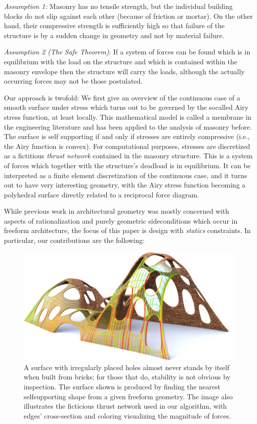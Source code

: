\documentclass[review]{acmsiggraph}
\begin{document}
{\it Assumption 1:} Masonry has no tensile strength, but the individual 
building blocks do not slip against each other (because of friction or 
mortar). On the other hand, their compressive strength is sufficiently 
high so that failure of the structure is by a sudden change in geometry
and not by material failure.

{\it Assumption 2 (The Safe Theorem)}: If a system of forces can be found 
which is in equilibrium with the load on the structure and which is 
contained within the masonry envelope then the structure will carry the 
loads, although the actually occurring forces may not be those postulated.

Our approach is twofold: We first give an overview of the continuous case 
of a smooth surface under stress which turns out to be governed by the 
so\dash called Airy stress function, at least locally. This mathematical 
model is called a membrane in the engineering literature and has been 
applied to the analysis of masonry before. The surface is self\dash 
supporting if and only if stresses are entirely compressive (i.e., the 
Airy function is convex). For computational purposes, stresses are 
discretized as a fictitious {\em thrust network} \cite{Block07} contained 
in the masonry structure. This is a system of forces which together with 
the structure's deadload is in equilibrium. It can be interpreted as a 
finite element discretization of the continuous case, and it turns out to 
have very interesting geometry, with the Airy stress function becoming a
polyhedral surface directly related to a reciprocal force diagram. 

While previous work in architectural geometry was mostly concerned
with aspects of rationalization and purely geometric side\dash conditions
which occur in freeform architecture, the focus of this paper is design with
{\em statics} constraints. In particular, our 
contributions are the following:


	\begin{figure}[t] 
	\includegraphics[width=\columnwidth]{arch-fig/cheesevault78.jpg} 
	\caption{A surface with irregularly placed holes almost 
never stands by itself when built from bricks; for those that do,
stability is not obvious by inspection. The surface shown is produced by 
finding the nearest self\dash supporting shape from a given freeform
geometry. The image also illustrates
the ficticious thrust network used in our algorithm,
with edges' cross-section and coloring visualizing the magnitude of
forces.}
	\label{fig:cheese}
\end{figure}
\end{document}
